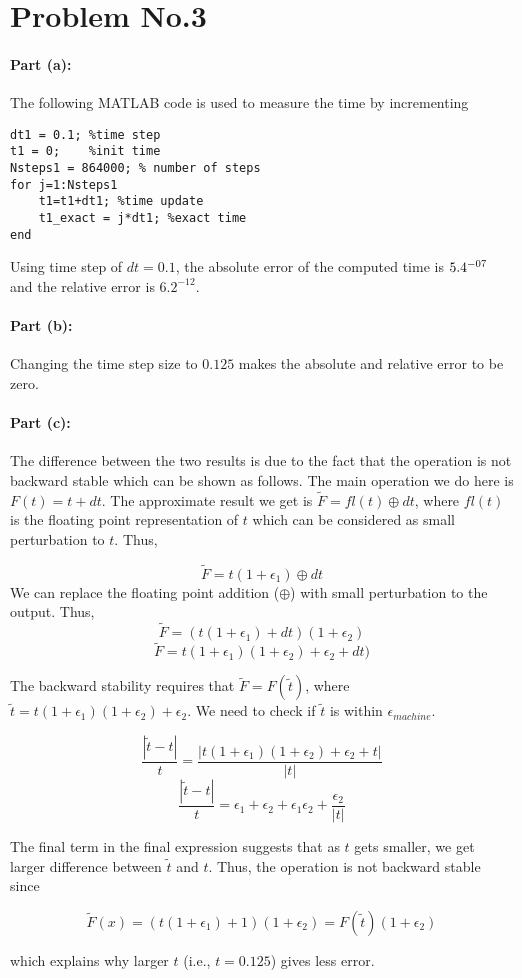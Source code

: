 \section*{Problem No.3} \label{sec:prob3}

\paragraph{Part (a):} 
The following MATLAB code is used to measure the time by incrementing  
\begin{lstlisting}
dt1 = 0.1; %time step
t1 = 0;    %init time 
Nsteps1 = 864000; % number of steps 
for j=1:Nsteps1
    t1=t1+dt1; %time update 
    t1_exact = j*dt1; %exact time 
end
\end{lstlisting}
Using time step of $dt = 0.1$, the absolute error of the computed time is $5.4\time 10^{-07}$ and the relative error is $6.2^{-12}$.  

\paragraph{Part (b):}
Changing the time step size to $0.125$ makes the absolute and relative error to be zero. 
\paragraph{Part (c):}
The difference between the two results is due to the fact that the operation is not backward stable which can be shown as follows. The main operation we do here is $F(t) = t + dt$. The approximate result we get is $\tilde{F} = fl(t) \oplus dt $, where $fl(t)$ is the floating point representation of $t$ which can be considered as small perturbation to $t$. Thus,

$$\tilde{F} = t(1+\epsilon_{1}) \oplus dt $$
We can replace the floating point addition ($\oplus$) with small perturbation to the output. Thus, 
$$\tilde{F} = (t(1+\epsilon_{1}) + dt)(1+\epsilon_{2}) $$
$$\tilde{F} = t(1+\epsilon_{1})(1+\epsilon_{2}) + \epsilon_{2} + dt) $$

The backward stability requires that $\tilde{F} = F(\tilde{t})$, where $\tilde{t} = t(1+\epsilon_{1})(1+\epsilon_{2}) + \epsilon_{2}$. We need to check if $\tilde{t}$ is within $\epsilon_{machine}$. 

$$
\frac{|\tilde{t}-t|}{t}= \frac{|t(1+\epsilon_{1})(1+\epsilon_{2})+\epsilon_{2}+t |}{|t|}
$$
$$
\frac{|\tilde{t}-t|}{t}= \epsilon_{1} + \epsilon_{2} + \epsilon_{1}  \epsilon_{2} + \frac{\epsilon_{2}}{|t|}
$$



The final term in the final expression suggests that as $t$ gets smaller, we get larger difference between $\tilde{t}$ and $t$. Thus, the operation is not backward stable since 

$$
\tilde{F}(x) = (t(1+\epsilon_{1})+1 )(1+\epsilon_{2}) = F(\tilde{t})(1+\epsilon_{2})
$$

which explains why larger $t$ (i.e., $t=0.125$) gives less error. 